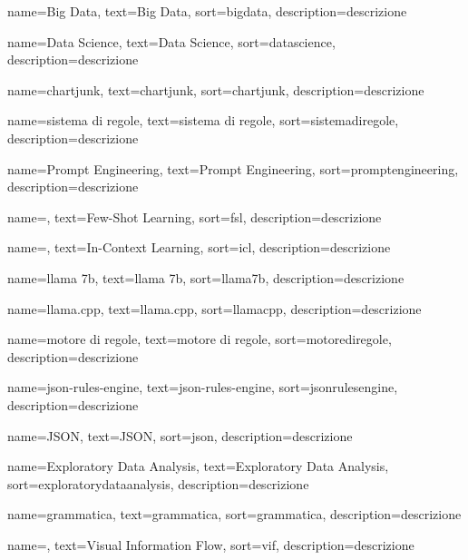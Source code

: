  {
    name=Big Data,
    text=Big Data,
    sort=bigdata,
    description={descrizione}
}

 {
    name=Data Science,
    text=Data Science,
    sort=datascience,
    description={descrizione}
}

 {
    name=chartjunk,
    text=chartjunk,
    sort=chartjunk,
    description={descrizione}
}

 {
    name=sistema di regole,
    text=sistema di regole,
    sort=sistemadiregole,
    description={descrizione}
}

 {
    name=Prompt Engineering,
    text=Prompt Engineering,
    sort=promptengineering,
    description={descrizione}
}

 {
    name=,
    text=Few-Shot Learning,
    sort=fsl,
    description={descrizione}
}

 {
    name=,
    text=In-Context Learning,
    sort=icl,
    description={descrizione}
}

 {
    name=llama 7b,
    text=llama 7b,
    sort=llama7b,
    description={descrizione}
}

 {
    name=llama.cpp,
    text=llama.cpp,
    sort=llamacpp,
    description={descrizione}
}

 {
    name=motore di regole,
    text=motore di regole,
    sort=motorediregole,
    description={descrizione}
}

 {
    name=json-rules-engine,
    text=json-rules-engine,
    sort=jsonrulesengine,
    description={descrizione}
}

 {
    name=JSON,
    text=JSON,
    sort=json,
    description={descrizione}
}

 {
    name=Exploratory Data Analysis,
    text=Exploratory Data Analysis,
    sort=exploratorydataanalysis,
    description={descrizione}
}

 {
    name=grammatica,
    text=grammatica,
    sort=grammatica,
    description={descrizione}
}

 {
    name=,
    text=Visual Information Flow,
    sort=vif,
    description={descrizione}
}



